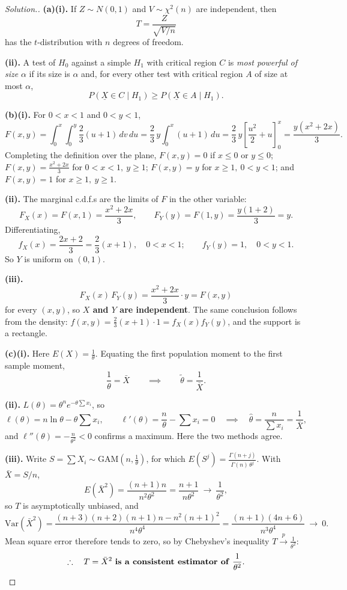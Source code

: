 \documentclass[12pt,a4paper]{report}
\theoremstyle{definition}
\theoremstyle{plain}
\newenvironment{solution}
  {\renewcommand{\qedsymbol}{}\begin{proof}[\textit{Solution}.]}
  {\end{proof}}
\begin{document}
\begin{solution}
\textbf{(a)(i).} If $Z\sim N(0,1)$ and $V\sim\chi^2(n)$ are independent, then
\[T=\frac{Z}{\sqrt{V/n}}\]
has the $t$-distribution with $n$ degrees of freedom.

\textbf{(ii).} A test of $H_0$ against a simple $H_1$ with critical region $C$ is
\emph{most powerful of size} $\alpha$ if its size is $\alpha$ and, for every other
test with critical region $A$ of size at most $\alpha$,
\[P\left(\underline{X}\in C\mid H_1\right)\geq
P\left(\underline{X}\in A\mid H_1\right).\]

\textbf{(b)(i).} For $0<x<1$ and $0<y<1$,
\[F(x,y)=\int_0^x\int_0^y\frac{2}{3}(u+1)\,dv\,du
=\frac{2}{3}\,y\int_0^x(u+1)\,du
=\frac{2}{3}\,y\left[\frac{u^2}{2}+u\right]_0^x
=\frac{y\left(x^2+2x\right)}{3}.\]
Completing the definition over the plane, $F(x,y)=0$ if $x\leq0$ or $y\leq0$;
$F(x,y)=\frac{x^2+2x}{3}$ for $0<x<1,\ y\geq1$; $F(x,y)=y$ for $x\geq1,\
0<y<1$; and $F(x,y)=1$ for $x\geq1,\ y\geq1$.

\textbf{(ii).} The marginal c.d.f.s are the limits of $F$ in the other variable:
\[F_X(x)=F(x,1)=\frac{x^2+2x}{3},\qquad F_Y(y)=F(1,y)=\frac{y(1+2)}{3}=y.\]
Differentiating,
\[f_X(x)=\frac{2x+2}{3}=\frac{2}{3}(x+1),\quad 0<x<1;\qquad
f_Y(y)=1,\quad 0<y<1.\]
So $Y$ is uniform on $(0,1)$.

\textbf{(iii).} \[F_X(x)\,F_Y(y)=\frac{x^2+2x}{3}\cdot y=F(x,y)\]
for every $(x,y)$, so \textbf{$X$ and $Y$ are independent}. The same conclusion
follows from the density: $f(x,y)=\frac{2}{3}(x+1)\cdot1=f_X(x)f_Y(y)$, and the
support is a rectangle.

\textbf{(c)(i).} Here $E(X)=\frac{1}{\theta}$. Equating the first population
moment to the first sample moment,
\[\frac{1}{\theta}=\bar X\qquad\implies\qquad\tilde\theta=\frac{1}{\bar X}.\]

\textbf{(ii).} $L(\theta)=\theta^ne^{-\theta\sum x_i}$, so
\[\ell(\theta)=n\ln\theta-\theta\sum x_i,\qquad
\ell'(\theta)=\frac{n}{\theta}-\sum x_i=0
\quad\implies\quad\hat\theta=\frac{n}{\sum x_i}=\frac{1}{\bar X},\]
and $\ell''(\theta)=-\frac{n}{\theta^2}<0$ confirms a maximum. Here the two
methods agree.

\textbf{(iii).} Write $S=\sum X_i\sim\text{GAM}\left(n,\frac{1}{\theta}\right)$,
for which $E\left(S^j\right)=\frac{\Gamma(n+j)}{\Gamma(n)\,\theta^j}$. With
$\bar X=S/n$,
\[E\left(\bar X^2\right)=\frac{(n+1)n}{n^2\theta^2}=\frac{n+1}{n\theta^2}
\ \longrightarrow\ \frac{1}{\theta^2},\]
so $T$ is asymptotically unbiased, and
\[\text{Var}\left(\bar X^2\right)
=\frac{(n+3)(n+2)(n+1)n-n^2(n+1)^2}{n^4\theta^4}
=\frac{(n+1)(4n+6)}{n^3\theta^4}\ \longrightarrow\ 0.\]
Mean square error therefore tends to zero, so by Chebyshev's inequality
$T\stackrel{p}{\longrightarrow}\frac{1}{\theta^2}$:
\[\therefore\quad T=\bar X^2\ \text{\textbf{is a consistent estimator of}}\
\frac{1}{\theta^2}.\]


\end{solution}
\end{document}
